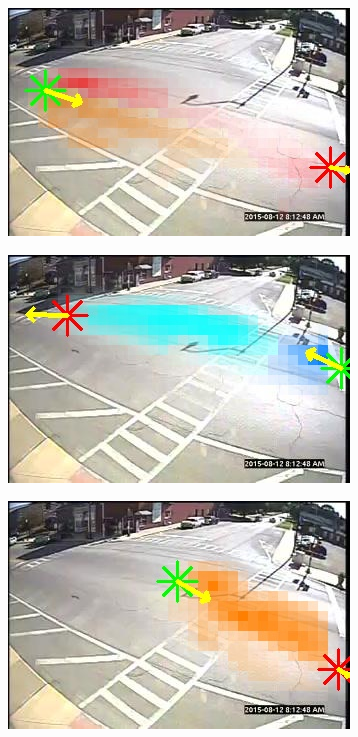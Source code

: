 \begin{figure}
    \centering
        \begin{subfigure}{0.32\linewidth}
            \includegraphics[width=\linewidth]{./img/scene_learning/res/251035/251035-0.jpg}
        \end{subfigure}
        \begin{subfigure}{0.32\linewidth}
            \includegraphics[width=\linewidth]{./img/scene_learning/res/251035/251035-1.jpg}
        \end{subfigure}
                \begin{subfigure}{0.32\linewidth}
            \includegraphics[width=\linewidth]{./img/scene_learning/res/251035/251035-2.jpg}

\end{subfigure}
\end{figure}
